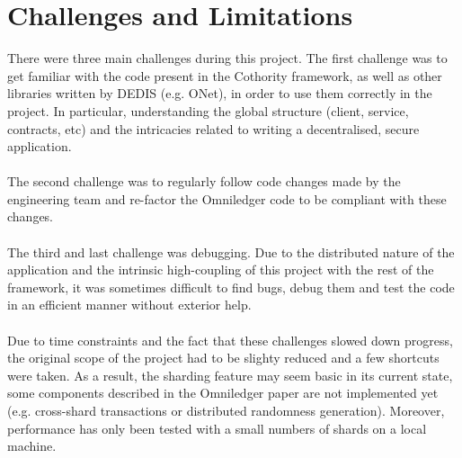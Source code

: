 \section{Challenges and Limitations} \label{limitation}
There were three main challenges during this project. The first challenge was to get familiar with the code present in the Cothority framework, as well as other libraries written by DEDIS (e.g. ONet), in order to use them correctly in the project. In particular, understanding the global structure (client, service, contracts, etc) and the intricacies related to writing a decentralised, secure application. \\\\
The second challenge was to regularly follow code changes made by the engineering team and re-factor the Omniledger code to be compliant with these changes. \\\\
The third and last challenge was debugging. Due to the distributed nature of the application and the intrinsic high-coupling of this project with the rest of the framework, it was sometimes difficult to find bugs, debug them and test the code in an efficient manner without exterior help. \\\\
Due to time constraints and the fact that these challenges slowed down progress, the original scope of the project had to be slighty reduced and a few shortcuts were taken. As a result, the sharding feature may seem basic in its current state, some components described in the Omniledger paper are not implemented yet (e.g. cross-shard transactions or distributed randomness generation). Moreover, performance has only been tested with a small numbers of shards on a local machine.




